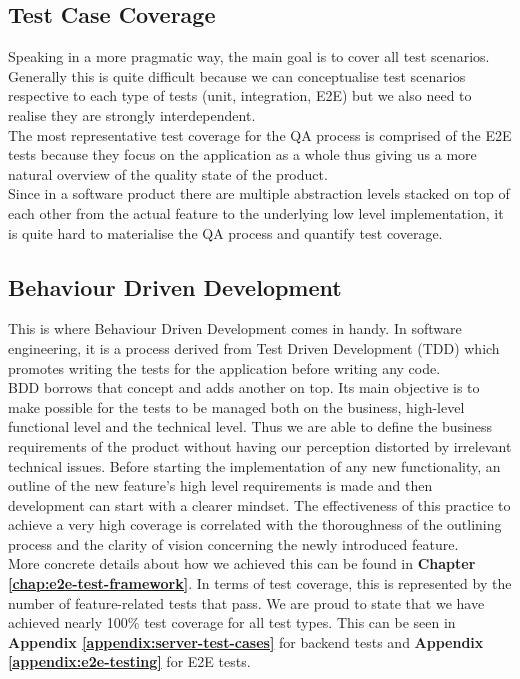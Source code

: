 \subsection{Test Case Coverage}
\label{subsec:test-case-coverage}

Speaking in a more pragmatic way, the main goal is to cover all test scenarios. Generally this is quite difficult because we can conceptualise test scenarios respective to each type of tests (unit, integration, E2E) but we also need to realise they are strongly interdependent.
\\

The most representative test coverage for the QA process is comprised of the E2E tests because they focus on the application as a whole thus giving us a more natural overview of the quality state of the product.
\\

Since in a software product there are multiple abstraction levels stacked on top of each other from the actual feature to the underlying low level implementation, it is quite hard to materialise the QA process and quantify test coverage.

\subsection{Behaviour Driven Development}
\label{subsubsec:bdd}

This is where Behaviour Driven Development comes in handy. In software engineering, it is a process derived from Test Driven Development (TDD) which promotes writing the tests for the application before writing any code.
\\

BDD borrows that concept and adds another on top. Its main objective is to make possible for the tests to be managed both on the business, high-level functional level and the technical level. Thus we are able to define the business requirements of the product without having our perception distorted by irrelevant technical issues. Before starting the implementation of any new functionality, an outline of the new feature's high level requirements is made and then development can start with a clearer mindset. The effectiveness of this practice to achieve a very high coverage is correlated with the thoroughness of the outlining process and the clarity of vision concerning the newly introduced feature.
\\

More concrete details about how we achieved this can be found in \textbf{Chapter \ref{chap:e2e-test-framework}}. In terms of test coverage, this is represented by the number of feature-related tests that pass. We are proud to state that we have achieved nearly 100\% test coverage for all test types. This can be seen in \textbf{Appendix \ref{appendix:server-test-cases}} for backend tests and \textbf{Appendix \ref{appendix:e2e-testing}} for E2E tests.

